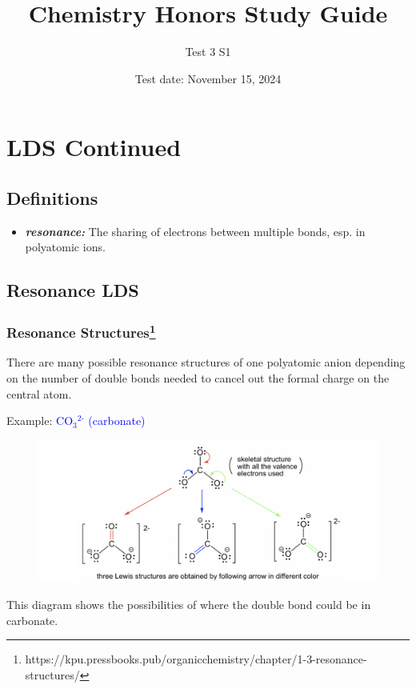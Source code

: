 \documentclass[a4paper, 12pt]{article}
\title{Chemistry Honors Study Guide}
\author{Test 3 S1}
\date{Test date: November 15, 2024}
\begin{document}
\maketitle

\section{LDS Continued}

\subsection*{Definitions}
\begin{itemize}[leftmargin=*, nosep]
    \item \textbf{\textit{resonance:}} The sharing of electrons between multiple bonds, esp. in polyatomic ions.
\end{itemize}

\subsection*{Resonance LDS}

\subsubsection*{Resonance Structures\footnote{https://kpu.pressbooks.pub/organicchemistry/chapter/1-3-resonance-structures/}}
There are many possible resonance structures of one polyatomic anion depending on the number of double bonds needed to cancel out the formal charge on the central atom.
 
Example: \textcolor{blue}{CO$_3$$^{\text{2-}}$ (carbonate)}

\begin{figure}[ht]
    \centering
    \includegraphics[width=0.8\linewidth]{resonancelds.png}
    \label{fig:200?!}
\end{figure}

\noindent This diagram shows the possibilities of where the double bond could be in carbonate.
\end{document}
